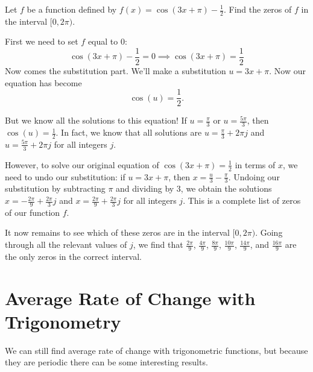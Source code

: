 \documentclass{ximera}
\begin{document}
\begin{example}
Let $f$ be a function defined by $f(x)=\cos(3x + \pi) - \frac{1}{2}$. Find the zeros of $f$ in the interval $[0, 2\pi)$.
\begin{explanation}
First we need to set $f$ equal to $0$:
$$\cos(3x + \pi) - \frac{1}{2} = 0 \implies \cos(3x + \pi) = \frac{1}{2}$$
Now comes the substitution part. We'll make a substitution $u = 3x + \pi$. Now our equation has become
$$\cos(u) = \frac{1}{2}.$$

But we know all the solutions to this equation! If $u = \frac{\pi}{3}$ or $u = \frac{5\pi}{3}$, then $\cos(u) = \frac{1}{2}$. In fact, we know that all solutions are $u = \frac{\pi}{3} + 2\pi j$ and $u = \frac{5\pi}{3} + 2\pi j$ for all integers $j$.

However, to solve our original equation of $\cos(3x + \pi) = \frac{1}{2}$ in terms of $x$, we need to undo our substitution: if $u = 3x + \pi$, then $x = \frac{u}{3} - \frac{\pi}{3}$. Undoing our substitution by subtracting $\pi$ and dividing by $3$, we obtain the solutions $x = -\frac{2\pi}{9} + \frac{2\pi}{3} j$ and $x = \frac{2\pi}{9} + \frac{2\pi}{3} j$ for all integers $j$. This is a complete list of zeros of our function $f$.   

It now remains to see which of these zeros are in the interval $[0, 2\pi)$. Going through all the relevant values of $j$, we find that $\frac{2\pi}{9}$, $\frac{4\pi}{9}$, $\frac{8\pi}{9}$, $\frac{10\pi}{9}$, $\frac{14\pi}{9}$, and $\frac{16\pi}{9}$ are the only zeros in the correct interval.  
\end{explanation}
\end{example}

\section{Average Rate of Change with Trigonometry}

We can still find average rate of change with trigonometric functions, but because they are periodic there can be some interesting results.
\end{document}
